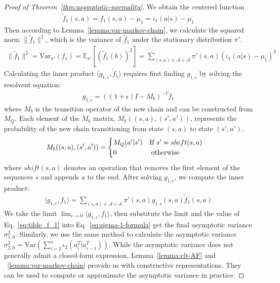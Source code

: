 \documentclass{article}
\theoremstyle{plain}
\theoremstyle{definition}
\theoremstyle{remark}
\begin{document}
\begin{proof}[Proof of Theorem~\ref{thm:asymptotic-normality}]
We obtain the centered function
\begin{align}
    \tilde{f}_1(s,a)=f_1(s,a)-\mu_1=\iota_1(a|s)-\mu_1
\end{align}
Then according to Lemma~\ref{lemma:var-markov-chain}, we calculate the squared norm $\|\tilde{f}_1\|^2$, which is the variance of $\tilde{f}_1$ under the stationary distribution $\pi'$.
\begin{align}
    \|\tilde{f}_1\|^2= \text{Var}_{\pi'}(f_1) = \mathbb{E}_{\pi'}[(\tilde{f}_1(b))^2]=\sum_{(s,a) \in \mathcal{A}\times \mathcal{A}} \pi'(s,a)(\iota_1(a|s)-\mu_1)^2 \label{eq:tilde_f_1}
\end{align}
Calculating the inner product $\langle g_{1,\epsilon},\tilde{f}_1 \rangle$ requires first finding $g_{1,\epsilon}$ by solving the resolvent equation:
\begin{align}
    g_{1,\epsilon} = ((1+\epsilon)I-M_b)^{-1} \tilde{f}_1 \label{eq:var-framework-2}
\end{align}
where $M_b$ is the transition operator of the new chain and can be constructed from $M_Q$. Each element of the $M_b$ matrix, $M_b((s,a),(s',a'))$,  represents the probability of the new chain transitioning from state $(s, a)$ to state $(s', a')$. 
\begin{align}
    M_b((s,a),(s',a')) = 
    \begin{cases} 
    M_Q(a'|s') \text{\quad If $s'=shift(s,a)$} \\
    0 \text{\quad   \quad    \quad\quad   \quad       otherwise}
    \end{cases}
\end{align}
where $shift(s,a)$ denotes an operation that removes the first element of the sequences $s$ and appends $a$ to the end. After solving $g_{1,\epsilon}$, we compute the inner product:
\begin{align}
    \langle g_{1,\epsilon},f_1 \rangle = \sum_{(s,a)\in \mathcal{A}\times \mathcal{A}} \pi'(s,a) g_{1,\epsilon}(s,a)\tilde{f}_1(s,a)
\end{align}
We take the limit $\lim_{\epsilon \rightarrow 0}\langle g_{1,\epsilon},f_1 \rangle$, then substitute the limit and the value of Eq.~\ref{eq:tilde_f_1} into Eq.~\ref{eq:sigma-1-formula} get the final asymptotic variance $\sigma_{1,0}^2$. Similarly, we use the same method to calculate the asymptotic variance $\sigma^{2}_{2,0}=\text{Var}(\sum_{i=2}^{n} \iota_2(a^T_{i}|a^T_{i-1}))$. While the asymptotic variance does not generally admit a closed-form expression, Lemma~\ref{lemma:clt-AF} and ~\ref{lemma:var-markov-chain} provide us with constructive representations. They can be used to compute or approximate the asymptotic variance in practice.


\end{proof}
\end{document}

